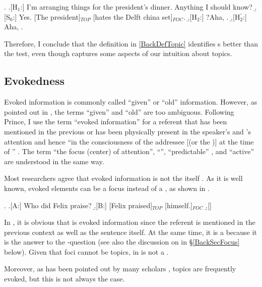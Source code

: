 \ex. \a.[H$_{1}$:] I'm arranging things for the president's dinner. Anything I should know?
     \b.[S$_{0}$:] Yes. [The president]$_{TOP}$ [hates the Delft china set]$_{FOC}$.
     \b.[H$_{2}$:] ?Aha, .
     \b.[H$_{2}^{\prime}$:] Aha, .


Therefore, I conclude that
the definition in \ref{BackDefTopic} identifies s better than the  test,
even though  captures some aspects of our intuition about topics.


\subsection{Evokedness}\label{BackEvoked}

Evoked information is commonly called ``given'' or ``old'' information.
However, as pointed out in ,
the terms ``given'' and ``old'' are too ambiguous.
Following Prince,
I use the term ``evoked information'' for a referent that has been mentioned in the previous  or has been physically present in the speaker's and 's attention
and hence ``in the consciousness of the addressee [(or the )] at the time of '' \cite[30]{chafe76}.
The term ``the focus (center) of attention'', ``'', ``predictable'' \cite{kuno72}, and ``active'' \cite{portner07} are understood in the same way.

Most researchers agree that evoked information is not the  itself \cite[]{reinhart81,gundel88,lambrecht94}.
As it is well known, evoked elements can be a focus instead of a , as shown in \Next[B].
%


\newpage
\ex.\label{BackExHimself} \a.[A:] Who did Felix praise?
     \b.[B:] [Felix praised]$_{TOP}$ [himself.]$_{FOC}$
     \b.[] \hfill{\cite[72, style modified by NN]{reinhart81}}

In \Last[B], it is obvious that  is evoked information
since the referent is mentioned in the previous context as well as the sentence itself.
At the same time, it is a  because
it is the answer to the -question (see also the discussion on  in \S \ref{BackSecFocus} below).
Given that foci cannot be topics,
 in \Last[B] is not a .

Moreover, as has been pointed out by many scholars \cite[see][]{li76,givon83,halliday04},
topics are frequently evoked, but this is not always the case.

